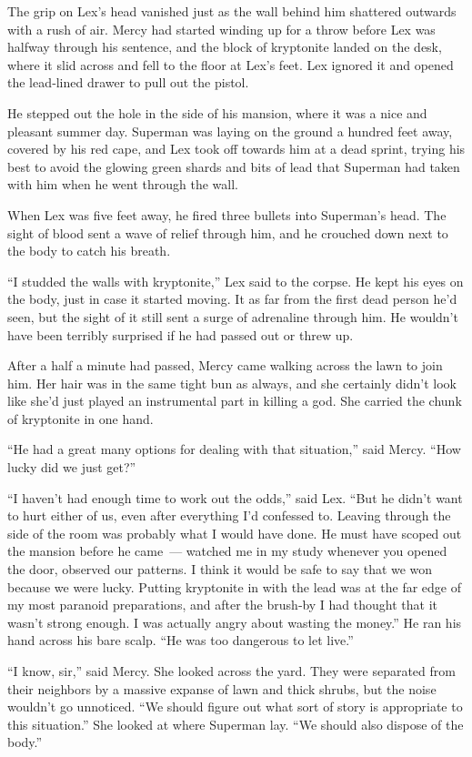 \documentclass[ebook,12pt]{memoir}
\begin{document}
The grip on Lex's head vanished just as the wall behind him shattered
outwards with a rush of air. Mercy had started winding up for a throw
before Lex was halfway through his sentence, and the block of kryptonite
landed on the desk, where it slid across and fell to the floor at Lex's
feet. Lex ignored it and opened the lead‐lined drawer to pull out the
pistol.

He stepped out the hole in the side of his mansion, where it was a nice
and pleasant summer day. Superman was laying on the ground a hundred
feet away, covered by his red cape, and Lex took off towards him at a
dead sprint, trying his best to avoid the glowing green shards and bits
of lead that Superman had taken with him when he went through the wall.

When Lex was five feet away, he fired three bullets into Superman's
head. The sight of blood sent a wave of relief through him, and he
crouched down next to the body to catch his breath.

``I studded the walls with kryptonite,'' Lex said to the corpse. He kept
his eyes on the body, just in case it started moving. It as far from the
first dead person he'd seen, but the sight of it still sent a surge of
adrenaline through him. He wouldn't have been terribly surprised if he
had passed out or threw up.

After a half a minute had passed, Mercy came walking across the lawn to
join him. Her hair was in the same tight bun as always, and she
certainly didn't look like she'd just played an instrumental part in
killing a god. She carried the chunk of kryptonite in one hand.

``He had a great many options for dealing with that situation,'' said
Mercy. ``How lucky did we just get?''

``I haven't had enough time to work out the odds,'' said Lex. ``But he
didn't want to hurt either of us, even after everything I'd confessed
to. Leaving through the side of the room was probably what I would have
done. He must have scoped out the mansion before he came~--- watched me
in my study whenever you opened the door, observed our patterns. I think
it would be safe to say that we won because we were lucky. Putting
kryptonite in with the lead was at the far edge of my most paranoid
preparations, and after the brush‐by I had thought that it wasn't strong
enough. I was actually angry about wasting the money.'' He ran his hand
across his bare scalp. ``He was too dangerous to let live.''

``I know, sir,'' said Mercy. She looked across the yard. They were
separated from their neighbors by a massive expanse of lawn and thick
shrubs, but the noise wouldn't go unnoticed. ``We should figure out what
sort of story is appropriate to this situation.'' She looked at where
Superman lay. ``We should also dispose of the body.''
\end{document}

